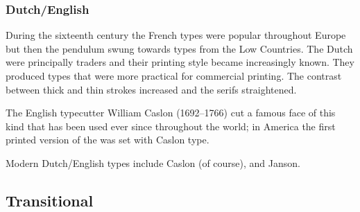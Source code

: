 \documentclass[10pt,a4paper,extrafontsizes]{memoir}
\begin{document}
\subsubsection{Dutch/English}


\begin{paracol}{2}
\switchEng
    During the sixteenth century the French types were popular throughout
Europe but then the pendulum swung towards types from the Low Countries.
The Dutch were principally traders and their printing style became 
increasingly known. They produced types that were more practical for
commercial printing. The contrast between thick and thin strokes increased
and the serifs straightened.

The English typecutter William Caslon (1692--1766) 
cut a famous face of this kind that has been used ever since throughout the 
world; in America the first printed version of the 
was set with Caslon type.

    Modern Dutch/English types include
Caslon (of course),
and Janson.
\end{paracol}

\subsection{Transitional}
\end{document}
